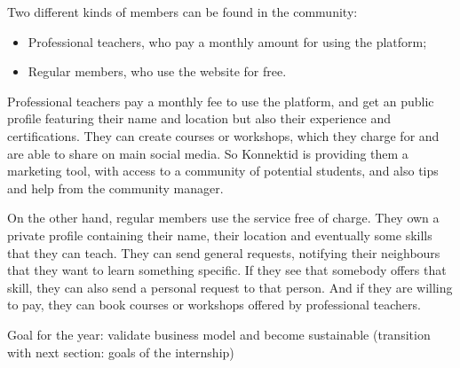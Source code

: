 Two different kinds of members can be found in the community:

\begin{itemize}
    \item Professional teachers, who pay a monthly amount for using the platform;
    \item Regular members, who use the website for free.
\end{itemize}

Professional teachers pay a monthly fee to use the platform, and get an public profile featuring their name and location but also their experience and certifications.
They can create courses or workshops, which they charge for and are able to share on main social media. So Konnektid is providing them a marketing tool,
with access to a community of potential students, and also tips and help from the community manager.

On the other hand, regular members use the service free of charge. They own a private profile containing their name, their location and eventually some skills that they can teach.
They can send general requests, notifying their neighbours that they want to learn something specific.
If they see that somebody offers that skill, they can also send a personal request to that person.
And if they are willing to pay, they can book courses or workshops offered by professional teachers.

Goal for the year: validate business model and become sustainable (transition with next section: goals of the internship)
